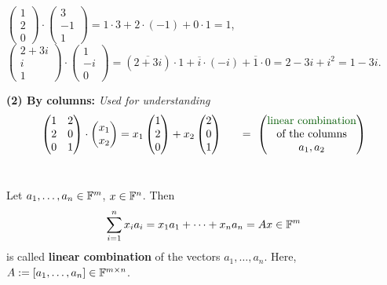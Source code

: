 \begin{frame}
{\begin{example}
	\small	$
	\begin{pmatrix}1\\2\\0\end{pmatrix}
	\cdot \begin{pmatrix}3\\-1\\1\end{pmatrix}
	= 1\cdot3+2\cdot(-1)+0\cdot1 = 1
	$,~~$
	\begin{pmatrix}2+3i\\i\\1\end{pmatrix}
	\cdot \begin{pmatrix}1\\-i\\0\end{pmatrix}
	= (\overline{2+3i})\cdot1+\overline{i}\cdot(-i)+\overline{1}\cdot 0 = 2-3i + i^2 = 1-3i
	$.
\end{example}
}
\end{frame}
\begin{frame}
\textbf{(2) By columns:} \textit{Used for understanding}\\
$$
\laMatVal
\cdot 
\begin{pmatrix}
x_1\\ x_2
\end{pmatrix}
= 	
x_1\laVecOneVal
+
x_2\laVecTwoVal
~~~~~= ~\begin{pmatrix}
\text{\color{defgruen}linear combination}\\ \text{of the columns}\\ a_1, a_2
\end{pmatrix}
$$
~\\
\begin{definition}
	Let $a_1, \ldots, a_n \in {\mathbb{F}}^m$, $x\in {\mathbb{F}}^{n}$. Then 
	$$ \sum_{i=1}^n x_i a_i = x_1 a_1 + \cdots + x_n a_n =  Ax \in {\mathbb{F}}^{m}$$
	is called \textbf{linear combination} of the vectors $a_1, \ldots, a_n$. Here, $A :=[a_1, \ldots,a_n] \in {\mathbb{F}}^{m\times n}$.
\end{definition}
%
\end{frame}




